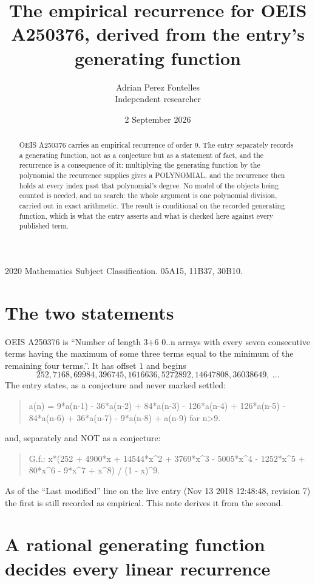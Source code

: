 \documentclass[11pt,a4paper]{article}
\title{The empirical recurrence for OEIS A250376, derived from the entry's generating function}
\author{Adrian Perez Fontelles\\ \small Independent researcher}
\date{2 September 2026}
\theoremstyle{plain}
\theoremstyle{definition}
\begin{document}
\maketitle

\begin{abstract}
OEIS A250376 carries an empirical recurrence of order $9$. The entry separately records a
generating function, not as a conjecture but as a statement of fact, and the recurrence is a
consequence of it: multiplying the generating function by the polynomial the recurrence
supplies gives a POLYNOMIAL, and the recurrence then holds at every index past that
polynomial's degree. No model of the objects being counted is needed, and no search: the
whole argument is one polynomial division, carried out in exact arithmetic. The result is
conditional on the recorded generating function, which is what the entry asserts and what is
checked here against every published term.
\end{abstract}

\noindent\small 2020 Mathematics Subject Classification. 05A15, 11B37, 30B10.\normalsize

\section{The two statements}

OEIS A250376 is ``Number of length 3+6 0..n arrays with every seven consecutive terms having the maximum of some three terms equal to the minimum of the remaining four terms.''. It has offset $1$ and begins
\[
252, 7168, 69984, 396745, 1616636, 5272892, 14647808, 36038649,\ \dots
\]
The entry states, as a conjecture and never marked settled:
\begin{quote}
a(n) = 9*a(n-1) - 36*a(n-2) + 84*a(n-3) - 126*a(n-4) + 126*a(n-5) - 84*a(n-6) + 36*a(n-7) - 9*a(n-8) + a(n-9) for n>9.
\end{quote}
and, separately and NOT as a conjecture:
\begin{quote}
G.f.: x*(252 + 4900*x + 14544*x\^{}2 + 3769*x\^{}3 - 5005*x\^{}4 - 1252*x\^{}5 + 80*x\^{}6 - 9*x\^{}7 + x\^{}8) / (1 - x)\^{}9.
\end{quote}
As of the ``Last modified'' line on the live entry (Nov 13 2018 12:48:48, revision 7) the first is still
recorded as empirical. This note derives it from the second.

\section{A rational generating function decides every linear recurrence}
\end{document}
